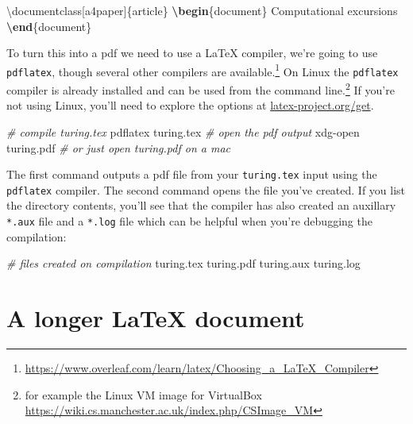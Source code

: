 \documentclass[
]{book}
\newenvironment{Shaded}{\begin{snugshade}}{\end{snugshade}}
\newcommand{\BuiltInTok}[1]{#1}
\newcommand{\CommentTok}[1]{\textcolor[rgb]{0.56,0.35,0.01}{\textit{#1}}}
\newcommand{\ExtensionTok}[1]{#1}
\newcommand{\KeywordTok}[1]{\textcolor[rgb]{0.13,0.29,0.53}{\textbf{#1}}}
\newcommand{\NormalTok}[1]{#1}
\newcommand{\SpecialCharTok}[1]{\textcolor[rgb]{0.00,0.00,0.00}{#1}}
\begin{document}
\begin{Shaded}
\begin{Highlighting}[]
\BuiltInTok{\textbackslash{}documentclass}\NormalTok{[a4paper]\{}\ExtensionTok{article}\NormalTok{\}}
\KeywordTok{\textbackslash{}begin}\NormalTok{\{}\ExtensionTok{document}\NormalTok{\}}
\NormalTok{Computational excursions}
\KeywordTok{\textbackslash{}end}\NormalTok{\{}\ExtensionTok{document}\NormalTok{\}}
\end{Highlighting}
\end{Shaded}

To turn this into a pdf we need to use a LaTeX compiler, we're going to use \texttt{pdflatex}, though several other compilers are available.\footnote{\url{https://www.overleaf.com/learn/latex/Choosing_a_LaTeX_Compiler}} On Linux the \texttt{pdflatex} compiler is already installed and can be used from the command line.\footnote{for example the Linux VM image for VirtualBox \url{https://wiki.cs.manchester.ac.uk/index.php/CSImage_VM}} If you're not using Linux, you'll need to explore the options at \href{https://www.latex-project.org/get/}{latex-project.org/get}.

\begin{Shaded}
\begin{Highlighting}[]
\CommentTok{\# compile turing.tex}
\NormalTok{pdflatex turing.tex}
\CommentTok{\# open the pdf output}
\NormalTok{xdg}\SpecialCharTok{{-}}\NormalTok{open turing.pdf}
\CommentTok{\# or just open turing.pdf on a mac}
\end{Highlighting}
\end{Shaded}

The first command outputs a pdf file from your \texttt{turing.tex} input using the \texttt{pdflatex} compiler. The second command opens the file you've created. If you list the directory contents, you'll see that the compiler has also created an auxillary \texttt{*.aux} file and a \texttt{*.log} file which can be helpful when you're debugging the compilation:

\begin{Shaded}
\begin{Highlighting}[]
\CommentTok{\# files created on compilation}
\NormalTok{turing.tex}
\NormalTok{turing.pdf}
\NormalTok{turing.aux}
\NormalTok{turing.log}
\end{Highlighting}
\end{Shaded}

\hypertarget{longer}{%
\section{A longer LaTeX document}\label{longer}}
\end{document}

